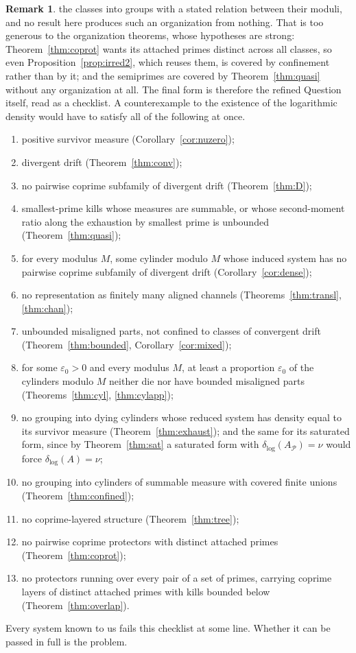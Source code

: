 \documentclass[11pt]{article}
\theoremstyle{plain}
\theoremstyle{definition}
\newtheorem{remark}[theorem]{Remark}
\newcommand{\dlog}{\delta_{\log}}
\begin{document}
\begin{remark}
the classes into groups with a stated relation between their
moduli, and no result here produces such an organization from
nothing.  That is
too generous to the organization theorems, whose hypotheses are
strong: Theorem~\ref{thm:coprot} wants its attached primes
distinct across all classes, so even Proposition~\ref{prop:irred2},
which reuses them, is covered by confinement rather than by it;
and the semiprimes are covered by Theorem~\ref{thm:quasi} without
any organization at all.  The final form is therefore the
refined Question itself, read as a checklist.
A counterexample to the existence of the logarithmic density
would have to satisfy all of the following at once.
\begin{enumerate}
\item positive survivor measure (Corollary~\ref{cor:nuzero});
\item divergent drift (Theorem~\ref{thm:conv});
\item no pairwise coprime subfamily of divergent drift
(Theorem~\ref{thm:D});
\item smallest-prime kills whose measures are summable, or whose
second-moment ratio along the exhaustion by smallest prime is
unbounded (Theorem~\ref{thm:quasi});
\item for every modulus $M$, some cylinder modulo $M$ whose
induced system has no pairwise coprime subfamily of divergent
drift (Corollary~\ref{cor:dense});
\item no representation as finitely many aligned channels
(Theorems~\ref{thm:transl}, \ref{thm:chan});
\item unbounded misaligned parts, not confined to classes of
convergent drift (Theorem~\ref{thm:bounded},
Corollary~\ref{cor:mixed});
\item for some $\varepsilon_0>0$ and every modulus $M$, at least
a proportion $\varepsilon_0$ of the cylinders modulo $M$ neither
die nor have bounded misaligned parts (Theorems~\ref{thm:cyl},
\ref{thm:cylapp});
\item no grouping into dying cylinders whose reduced system has
density equal to its survivor measure
(Theorem~\ref{thm:exhaust}); and the same for its saturated
form, since by Theorem~\ref{thm:sat} a saturated form with
$\dlog(A_{\mathcal{P}})=\nu$ would force $\dlog(A)=\nu$;
\item no grouping into cylinders of summable measure with
covered finite unions (Theorem~\ref{thm:confined});
\item no coprime-layered structure (Theorem~\ref{thm:tree});
\item no pairwise coprime protectors with distinct attached
primes (Theorem~\ref{thm:coprot});
\item no protectors running over every pair of a set of primes,
carrying coprime layers of distinct attached primes with kills
bounded below (Theorem~\ref{thm:overlap}).
\end{enumerate}
Every system known to us fails this checklist at some line.
Whether it can be passed in full is the problem.


\end{remark}
\end{document}
